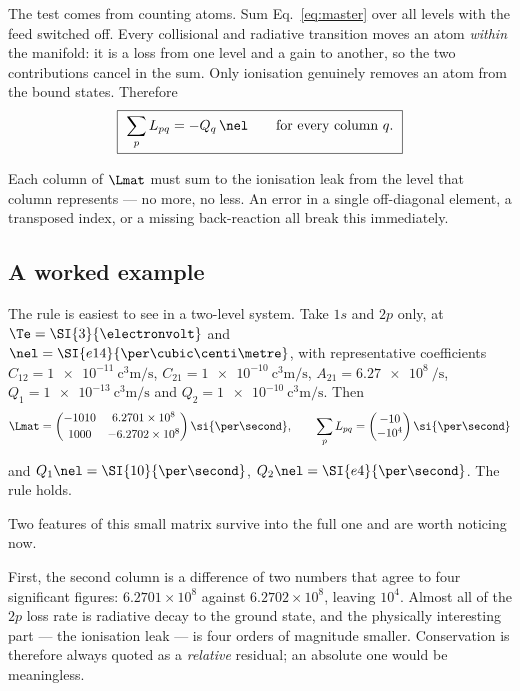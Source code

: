 The test comes from counting atoms. Sum Eq.~\eqref{eq:master} over all levels
with the feed switched off. Every collisional and radiative transition moves an
atom \emph{within} the manifold: it is a loss from one level and a gain to
another, so the two contributions cancel in the sum. Only ionisation genuinely
removes an atom from the bound states. Therefore
\begin{equation}
  \boxed{\ \sum_{p} L_{pq} = -Q_q\,\nel \qquad \text{for every column } q.\ }
  \label{eq:conservation}
\end{equation}

\noindent Each column of $\Lmat$ must sum to the ionisation leak from the level
that column represents --- no more, no less. An error in a single off-diagonal
element, a transposed index, or a missing back-reaction all break this
immediately.

\subsection{A worked example}

The rule is easiest to see in a two-level system. Take $1s$ and $2p$ only, at
$\Te = \SI{3}{\electronvolt}$ and $\nel = \SI{e14}{\per\cubic\centi\metre}$, with
representative coefficients $C_{12} = \SI{1e-11}{\cubic\centi\metre\per\second}$,
$C_{21} = \SI{1e-10}{\cubic\centi\metre\per\second}$,
$A_{21} = \SI{6.27e8}{\per\second}$,
$Q_1 = \SI{1e-13}{\cubic\centi\metre\per\second}$ and
$Q_2 = \SI{1e-10}{\cubic\centi\metre\per\second}$. Then
\begin{equation}
  \Lmat =
  \begin{pmatrix}
    -1010 & 6.2701\times10^{8}\\[2pt]
    1000  & -6.2702\times10^{8}
  \end{pmatrix}\si{\per\second},
  \qquad
  \sum_p L_{pq} = \begin{pmatrix}-10 \\ -10^{4}\end{pmatrix}\si{\per\second}
  \label{eq:toy_matrix}
\end{equation}

\noindent and $Q_1\nel = \SI{10}{\per\second}$, $Q_2\nel = \SI{e4}{\per\second}$.
The rule holds.

Two features of this small matrix survive into the full one and are worth
noticing now.

First, the second column is a difference of two numbers that agree to four
significant figures: $6.2701\times10^{8}$ against $6.2702\times10^{8}$, leaving
$10^{4}$. Almost all of the $2p$ loss rate is radiative decay to the ground
state, and the physically interesting part --- the ionisation leak --- is four
orders of magnitude smaller. Conservation is therefore always quoted as a
\emph{relative} residual; an absolute one would be meaningless.

